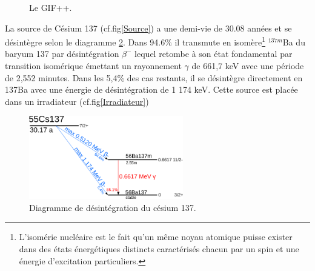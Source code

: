 \begin{figure}[ht!]
	\centering
	\hfill
	\caption{Le GIF++.}
	\label{GIF}
\end{figure}


La source de Césium 137 (cf.fig\ref{Source}) a une demi-vie de 30.08 années et se désintègre selon le diagramme \ref{Diagramme}. Dans 94.6\% il transmute en isomère\footnote{L’isomérie nucléaire est le fait qu'un même noyau atomique puisse exister dans des états énergétiques distincts caractérisés chacun par un spin et une énergie d'excitation particuliers.} $^{137m}$Ba du baryum 137 par désintégration $\beta^{-}$ lequel retombe à son état fondamental par transition isomérique émettant un rayonnement $\gamma$ de 661,7 keV avec une période de 2,552 minutes. Dans les 5,4\% des cas restants, il se désintègre directement en 137Ba avec une énergie de désintégration de 1 174 keV. Cette source est placée dans un irradiateur (cf.fig\ref{Irradiateur})

\begin{figure}[!ht]
	\centering
	\includegraphics[width=0.6\textwidth]{GLA/Cesium137.png}
	\caption{Diagramme de désintégration du césium 137.}
	\label{Diagramme}
\end{figure}


